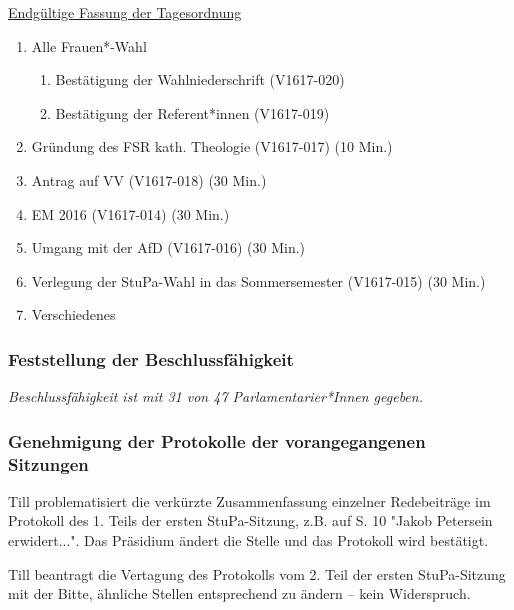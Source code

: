 \documentclass[ngerman,headheight=70pt]{scrartcl}
\begin{document}
    \underline{Endgültige Fassung der Tagesordnung}
    \begin{enumerate}[label={\textbf{Top \theenumi}},leftmargin=*]
        \item Alle Frauen*-Wahl
            \begin{enumerate}
                \item Bestätigung der Wahlniederschrift (V1617-020)
                \item Bestätigung der Referent*innen (V1617-019)
            \end{enumerate}
        \item Gründung des FSR kath. Theologie (V1617-017) (10 Min.)
        \item Antrag auf VV (V1617-018) (30 Min.)
        \item EM 2016 (V1617-014) (30 Min.)
        \item Umgang mit der AfD (V1617-016) (30 Min.)
        \item Verlegung der StuPa-Wahl in das Sommersemester (V1617-015) (30 Min.)
        \item Verschiedenes
    \end{enumerate}

    \subsubsection{Feststellung der Beschlussfähigkeit}

    \textit{Beschlussfähigkeit ist mit 31 von 47 Parlamentarier*Innen gegeben.}

    \subsubsection{Genehmigung der Protokolle der vorangegangenen Sitzungen}

    Till problematisiert die verkürzte Zusammenfassung einzelner Redebeiträge im
    Protokoll des 1. Teils der ersten StuPa-Sitzung, z.B. auf S. 10 "Jakob
    Petersein erwidert...". Das Präsidium ändert die Stelle und das Protokoll
    wird bestätigt.

    Till beantragt die Vertagung des Protokolls vom 2. Teil der ersten
    StuPa-Sitzung mit der Bitte, ähnliche Stellen entsprechend zu ändern -- kein
    Widerspruch.
\end{document}
